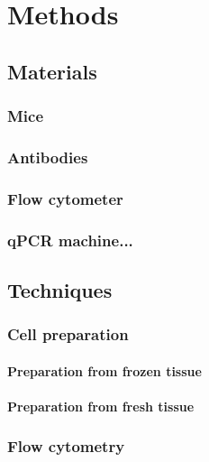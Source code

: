 
\chapter{Methods}

\section{Materials}

\subsection{Mice}

\subsection{Antibodies}

\subsection{Flow cytometer}

\subsection{qPCR machine...}

\section{Techniques}

\subsection{Cell preparation}

\subsubsection{Preparation from frozen tissue}

\subsubsection{Preparation from fresh tissue}

\subsection{Flow cytometry}

